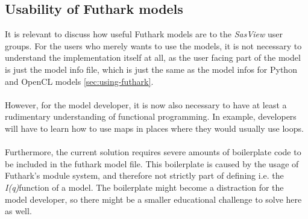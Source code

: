 \documentclass[11pt]{article}
\newcommand{\sasview}{\textit{SasView}}
\newcommand{\iq}{\textit{I(q)}}
\begin{document}
\subsection{Usability of Futhark models}
It is relevant to discuss how useful Futhark models are to the \sasview{} user
groups. For the users who merely wants to use the models, it is not necessary
to understand the implementation itself at all, as the user facing part of
the model is just the model info file, which is just the same as the model infos
for Python and OpenCL models \ref{sec:using-futhark}.
\\\\
However, for the model developer, it is now also necessary to have at least a
rudimentary understanding of functional programming.
In example, developers will have to learn how to use maps in
places where they would usually use loops.
\\\\
Furthermore, the current solution requires severe amounts of boilerplate code to
be included in the futhark model file.
This boilerplate is caused by the usage of Futhark's module system, and
therefore not strictly part of defining i.e. the \iq function of a model.
The boilerplate might become a distraction for the model developer, so
there might be a smaller educational challenge to solve here as well.
\\\\
\end{document}
